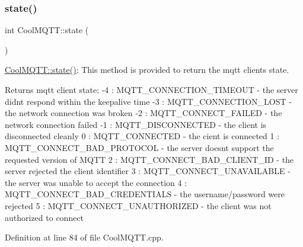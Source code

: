 \subsubsection{\texorpdfstring{state()}{state()}}
{\footnotesize\ttfamily int Cool\+M\+Q\+T\+T\+::state (\begin{DoxyParamCaption}{ }\end{DoxyParamCaption})}

\hyperlink{class_cool_m_q_t_t_a5d003307eff78efbd585e42b43b72b6d}{Cool\+M\+Q\+T\+T\+::state()}\+: This method is provided to return the mqtt client\textquotesingle{}s state. \begin{DoxyReturn}{Returns}
mqtt client state\+: -\/4 \+: M\+Q\+T\+T\+\_\+\+C\+O\+N\+N\+E\+C\+T\+I\+O\+N\+\_\+\+T\+I\+M\+E\+O\+UT -\/ the server didn\textquotesingle{}t respond within the keepalive time -\/3 \+: M\+Q\+T\+T\+\_\+\+C\+O\+N\+N\+E\+C\+T\+I\+O\+N\+\_\+\+L\+O\+ST -\/ the network connection was broken -\/2 \+: M\+Q\+T\+T\+\_\+\+C\+O\+N\+N\+E\+C\+T\+\_\+\+F\+A\+I\+L\+ED -\/ the network connection failed -\/1 \+: M\+Q\+T\+T\+\_\+\+D\+I\+S\+C\+O\+N\+N\+E\+C\+T\+ED -\/ the client is disconnected cleanly 0 \+: M\+Q\+T\+T\+\_\+\+C\+O\+N\+N\+E\+C\+T\+ED -\/ the cient is connected 1 \+: M\+Q\+T\+T\+\_\+\+C\+O\+N\+N\+E\+C\+T\+\_\+\+B\+A\+D\+\_\+\+P\+R\+O\+T\+O\+C\+OL -\/ the server doesn\textquotesingle{}t support the requested version of M\+Q\+TT 2 \+: M\+Q\+T\+T\+\_\+\+C\+O\+N\+N\+E\+C\+T\+\_\+\+B\+A\+D\+\_\+\+C\+L\+I\+E\+N\+T\+\_\+\+ID -\/ the server rejected the client identifier 3 \+: M\+Q\+T\+T\+\_\+\+C\+O\+N\+N\+E\+C\+T\+\_\+\+U\+N\+A\+V\+A\+I\+L\+A\+B\+LE -\/ the server was unable to accept the connection 4 \+: M\+Q\+T\+T\+\_\+\+C\+O\+N\+N\+E\+C\+T\+\_\+\+B\+A\+D\+\_\+\+C\+R\+E\+D\+E\+N\+T\+I\+A\+LS -\/ the username/password were rejected 5 \+: M\+Q\+T\+T\+\_\+\+C\+O\+N\+N\+E\+C\+T\+\_\+\+U\+N\+A\+U\+T\+H\+O\+R\+I\+Z\+ED -\/ the client was not authorized to connect 
\end{DoxyReturn}


Definition at line 84 of file Cool\+M\+Q\+T\+T.\+cpp.


